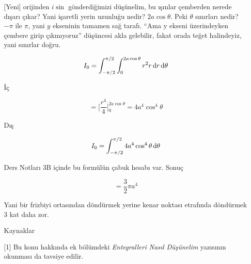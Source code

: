 \documentclass[12pt,fleqn]{article}\usepackage{../../common}
\begin{document}
[Yeni] orijinden $i\sin$ gönderdiğimizi düşünelim, bu ışınlar çemberden nerede
dışarı çıkar? Yani işaretli yerin uzunluğu nedir? $2a \cos\theta$. Peki
$\theta$ sınırları nedir? $-\pi$ ile $\pi$, yani $y$ ekseninin tamamen sağ
tarafı. ``Ama y ekseni üzerindeyken çembere girip çıkmıyoruz'' düşüncesi
akla gelebilir, fakat orada teğet halindeyiz, yani sınırlar doğru. 

$$ I_0 = \int_{-\pi/2}^{\pi/2} \int_0^{2a \cos\theta} r^2 r \,\mathrm{d} r \,\mathrm{d}\theta $$

İç

$$ = \bigg[ \frac{r^4}{4} \bigg]_{0}^{2a \cos\theta} =
4a^4 \cos^4\theta
$$

Dış

$$ I_0 = \int_{-\pi/2}^{\pi/2} 4a^4 \cos^4\theta \,\mathrm{d}\theta $$

Ders Notları 3B içinde bu formülün çabuk hesabı var. Sonuç

$$  = \frac{3}{2} \pi a^4 $$

Yani bir frizbiyi ortasından döndürmek yerine kenar noktası etrafında
döndürmek 3 kat daha zor. 

Kaynaklar

[1] Bu konu hakkında ek bölümdeki {\em Entegralleri Nasıl Düşünelim}
yazısının okunması da tavsiye edilir.
\end{document}
